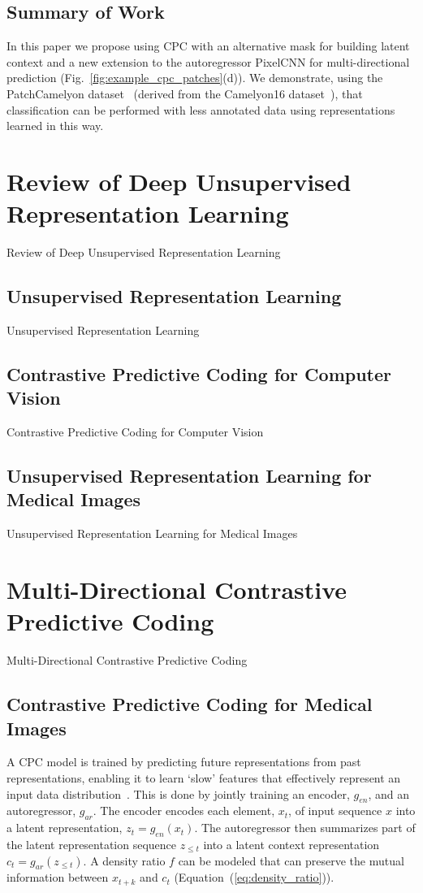 \subsection{Summary of Work}
In this paper we propose using CPC with an alternative mask for building latent context and a new extension to the autoregressor PixelCNN for multi-directional prediction (Fig.~\ref{fig:example_cpc_patches}(d)). We demonstrate, using the PatchCamelyon dataset~\cite{veeling2018rotation} (derived from the Camelyon16 dataset~\cite{litjens20181399}), that classification can be performed with less annotated data using representations learned in this way.



\section{Review of Deep Unsupervised Representation Learning}
Review of Deep Unsupervised Representation Learning

\subsection{Unsupervised Representation Learning}
Unsupervised Representation Learning

\subsection{Contrastive Predictive Coding for Computer Vision}
Contrastive Predictive Coding for Computer Vision

\subsection{Unsupervised Representation Learning for Medical Images}
Unsupervised Representation Learning for Medical Images



\section{Multi-Directional Contrastive Predictive Coding}
Multi-Directional Contrastive Predictive Coding

\subsection{Contrastive Predictive Coding for Medical Images}
A CPC model is trained by predicting future representations from past representations, enabling it to learn `slow' features that effectively represent an input data distribution~\cite{henaff2019data,oord2018representation}. This is done by jointly training an encoder, \(g_{en}\), and an autoregressor, \(g_{ar}\). The encoder encodes each element, \(x_t\), of input sequence \(x\) into a latent representation, \(z_t = g_{en}(x_t)\). The autoregressor then summarizes part of the latent representation sequence \(z_{\le t}\) into a latent context representation \(c_t = g_{ar}(z_{\le t})\). A density ratio \(f\) can be modeled that can preserve the mutual information between \(x_{t+k}\) and \(c_t\) (Equation~(\ref{eq:density_ratio})).

